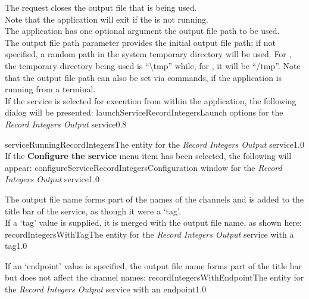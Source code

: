 The  request closes the output
file that is being used.\\

Note that the application will exit if the  is not
running.\\

The application has one optional argument \longDash{} the output file path to be used.
\insertAppParameters
{}
\insertOutputServiceComment\\

The output file path parameter provides the initial output file path; if not specified, a
random path in the system temporary directory will be used.
For \win, the temporary directory being used is ``\textbackslash{}tmp'' while, for \mac{},
it will be ``/tmp''.
Note that the output file path can also be set via commands, if the application is
running from a terminal.\\

\insertStandardServiceCommands
\condPage{}
If the service is selected for execution from within the \emph{\MMMU} application, the
following dialog will be presented:
%
{launchServiceRecordIntegers}{Launch options for the \emph{Record Integers Output}
service}{0.8}

%
{serviceRunningRecordIntegers}{The \emph{\MMMU} entity for the \emph{Record Integers
Output} service}{1.0}
\condPage{}
If the \textbf{Configure the service} menu item has been selected, the following will
appear:
%
{configureServiceRecordIntegers}{Configuration window for the \emph{Record Integers
Output} service}{1.0}

The output file name forms part of the names of the channels and is added to the title bar
of the service, as though it were a `tag'.\\

If a `tag' value is supplied, it is merged with the output file name, as shown here:
%
{recordIntegersWithTag}{The \emph{\MMMU} entity for the \emph{Record Integers Output}
service with a tag}{1.0}

If an `endpoint' value is specified, the output file name forms part of the title bar but
does not affect the channel names:
%
{recordIntegersWithEndpoint}{The \emph{\MMMU} entity for the \emph{Record Integers Output}
service with an endpoint}{1.0}

